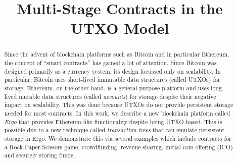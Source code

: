 \documentclass[runningheads]{llncs}
\newcommand{\langname}{ErgoScript\xspace}
\begin{document}

\title{Multi-Stage Contracts in the UTXO Model}




\maketitle


\begin{abstract}
	
Since the advent of blockchain platforms such as Bitcoin and in particular Ethereum, the concept of ``smart contracts'' has gained a lot of attention. Since Bitcoin was designed primarily as a currency system, its design focussed only on scalability. In particular, Bitcoin uses short-lived immutable data structures (called UTXOs) for storage. Ethereum, on the other hand, is a general-purpose platform and uses long-lived mutable data structures (called {\em accounts}) for storage despite their negative impact on scalability. This was done because UTXOs do not provide persistent storage needed for most contracts.
In this work, we describe a new blockchain platform called {\em Ergo} that provides Ethereum-like functionality despite being UTXO-based. 
This is possible due to a new technique called {\em transaction trees} that can emulate persistent storage in Ergo. We demonstrate this via several examples which include contracts for a Rock-Paper-Scissors game, crowdfunding, revenue sharing, initial coin offering (ICO) and securely storing funds.




 


\end{abstract}
\end{document}
